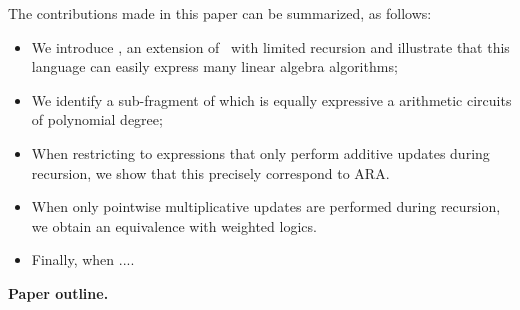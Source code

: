 The contributions made in this paper can be summarized, as follows:
\begin{itemize}
	\item We introduce \langfor, an extension of \lang\ with limited recursion and illustrate that this language can easily express  many linear algebra algorithms;
	\item We identify a sub-fragment of \langfor which is equally expressive a arithmetic circuits of polynomial degree;
	\item When restricting \langfor to expressions that only perform additive updates during recursion, we show that this precisely correspond to ARA.
	\item When only pointwise multiplicative updates are performed during recursion, we obtain an equivalence with weighted logics.
	\item Finally, when ....
\end{itemize}

\medskip
\noindent
\textbf{Paper outline.}


